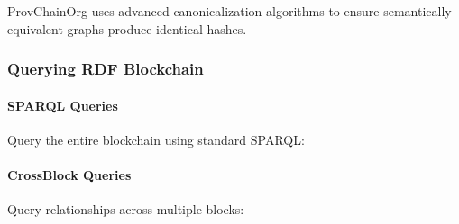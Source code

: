 \documentclass[letterpaper,10pt,english]{sphinxmanual}
\begin{document}
\sphinxAtStartPar
ProvChainOrg uses advanced canonicalization algorithms to ensure semantically equivalent graphs produce identical hashes.


\subsubsection{Querying RDF Blockchain}
\label{\detokenize{foundational/intro-to-rdf-blockchain:querying-rdf-blockchain}}

\paragraph{SPARQL Queries}
\label{\detokenize{foundational/intro-to-rdf-blockchain:sparql-queries}}
\sphinxAtStartPar
Query the entire blockchain using standard SPARQL:

\begin{sphinxVerbatim}[commandchars=\\\{\}]
     
     
           
           
           
           
\end{sphinxVerbatim}


\paragraph{Cross\sphinxhyphen{}Block Queries}
\label{\detokenize{foundational/intro-to-rdf-blockchain:cross-block-queries}}
\sphinxAtStartPar
Query relationships across multiple blocks:

\begin{sphinxVerbatim}[commandchars=\\\{\}]
     
     
     
              
 
\end{sphinxVerbatim}
\end{document}

